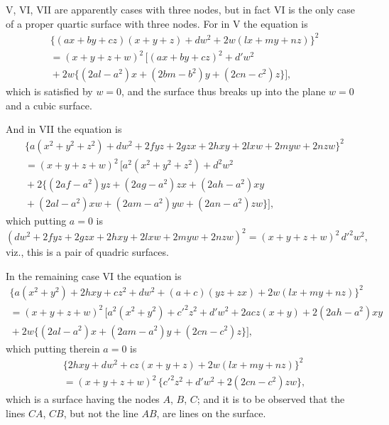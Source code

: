\documentclass[11pt,a4paper]{article}
\begin{document}
\medskip

V, VI, VII are apparently cases with three nodes, but in fact VI is the
only case of a proper quartic surface with three nodes. For in V the
equation is
\begin{multline*}
\{(a x + b y + c z)(x + y + z) + d w^{2} + 2 w (l x + m y + n z)\}^{2}\\
= (x + y + z + w)^{2}\,[(a x + b y + c z)^{2} + d' w^{2}\\
{}+ 2 w \{(2 a l - a^{2}) x + (2 b m - b^{2}) y + (2 c n - c^{2}) z\}],
\end{multline*}
which is satisfied by $w = 0$, and the surface thus breaks up into the
plane $w = 0$ and a cubic surface.

And in VII the equation is
\begin{multline*}
\{a (x^{2} + y^{2} + z^{2}) + d w^{2}
+ 2 f y z + 2 g z x + 2 h x y + 2 l x w + 2 m y w + 2 n z w\}^{2}\\
= (x + y + z + w)^{2}\,[a^{2}(x^{2} + y^{2} + z^{2}) + d^{2} w^{2}\\
{}+ 2 \{(2 a f - a^{2}) y z + (2 a g - a^{2}) z x + (2 a h - a^{2}) x y\\
{}+ (2 a l - a^{2}) x w + (2 a m - a^{2}) y w + (2 a n - a^{2}) z w\}],
\end{multline*}
which putting $a = 0$ is
\[
(d w^{2} + 2 f y z + 2 g z x + 2 h x y + 2 l x w + 2 m y w + 2 n z w)^{2}
= (x + y + z + w)^{2}\,d'^{2} w^{2},
\]
viz., this is a pair of quadric surfaces.

In the remaining case VI the equation is
\begin{multline*}
\{a (x^{2} + y^{2}) + 2 h x y + c z^{2} + d w^{2}
+ (a + c)(y z + z x) + 2 w (l x + m y + n z)\}^{2}\\
= (x + y + z + w)^{2}\,[a^{2}(x^{2} + y^{2}) + c'^{2} z^{2} + d' w^{2}
+ 2 a c z (x + y) + 2 (2 a h - a^{2}) x y\\
{}+ 2 w \{(2 a l - a^{2}) x + (2 a m - a^{2}) y + (2 c n - c^{2}) z\}],
\tag{$AG$}
\end{multline*}
which putting therein $a = 0$ is
\begin{multline*}
\{2 h x y + d w^{2} + c z (x + y + z) + 2 w (l x + m y + n z)\}^{2}\\
= (x + y + z + w)^{2}\,\{c'^{2} z^{2} + d' w^{2} + 2 (2 c n - c^{2}) z w\},
\tag{$AG$}
\end{multline*}
which is a surface having the nodes $A$, $B$, $C$; and it is to be
observed that the lines $CA$, $CB$, but not the line $AB$, are lines on
the surface.
\end{document}
